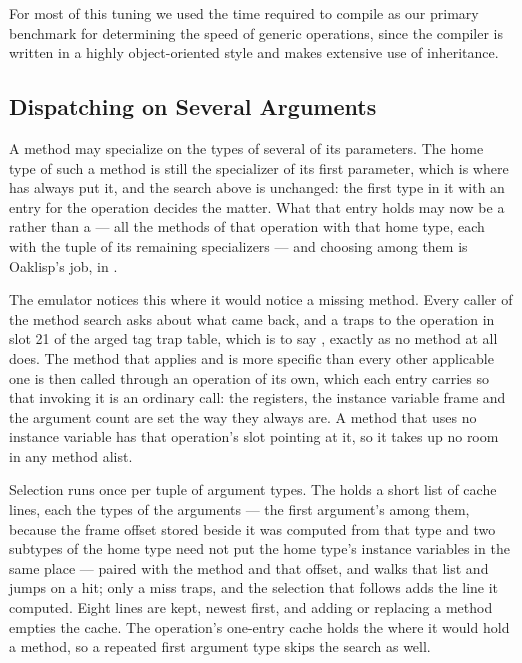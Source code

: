 For most of this tuning we used the time required to compile
 as our primary benchmark for determining the
speed of generic operations, since the compiler is written in a highly
object-oriented style and makes extensive use of inheritance.



\subsection{Dispatching on Several Arguments}

A method may specialize on the types of several of its parameters.
The home type of such a method is still the specializer of its first
parameter, which is where  has always put
it, and the search above is unchanged: the first type in it with an
entry for the operation decides the matter.  What that entry holds may
now be a  rather than a  --- all the
methods of that operation with that home type, each with the tuple of
its remaining specializers --- and choosing among them is Oaklisp's
job, in .

The emulator notices this where it would notice a missing method.
Every caller of the method search asks  about
what came back, and a  traps to the operation in
slot 21 of the arged tag trap table, which is to say
, exactly as no method at all does.  The method
that applies and is more specific than every other applicable one is
then called through an operation of its own, which each entry carries
so that invoking it is an ordinary call: the registers, the instance
variable frame and the argument count are set the way they always are.
A method that uses no instance variable has that operation's
 slot pointing at it, so it takes up no room in any method
alist.

Selection runs once per tuple of argument types.  The
 holds a short list of cache lines, each the types
of the arguments --- the first argument's among them, because the
frame offset stored beside it was computed from that type and two
subtypes of the home type need not put the home type's instance
variables in the same place --- paired with the method and that
offset, and  walks that list and jumps on a hit; only a
miss traps, and the selection that follows adds the line it
computed.  Eight lines are kept, newest first, and adding
or replacing a method empties the cache.  The operation's one-entry
cache holds the  where it would hold a method, so a
repeated first argument type skips the search as well.

